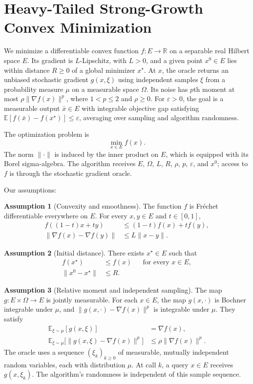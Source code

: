 \documentclass[10pt]{article}
\theoremstyle{definition}
\newtheorem{assumption}{Assumption}
\begin{document}
\section*{Heavy-Tailed Strong-Growth Convex Minimization}
We minimize a differentiable convex function $f:E\to\mathbb{R}$ on a separable real Hilbert space $E$. Its gradient is $L$-Lipschitz, with $L>0$, and a given point $x^0\in E$ lies within distance $R\geq0$ of a global minimizer $x^\star$. At $x$, the oracle returns an unbiased stochastic gradient $g(x,\xi)$ using independent samples $\xi$ from a probability measure $\mu$ on a measurable space $\Omega$. Its noise has $p$th moment at most $\rho\|\nabla f(x)\|^p$, where $1<p\leq2$ and $\rho\geq0$. For $\varepsilon>0$, the goal is a measurable output $\bar{x}\in E$ with integrable objective gap satisfying $\mathbb{E}[f(\bar{x})-f(x^\star)]\leq\varepsilon$, averaging over sampling and algorithm randomness.

The optimization problem is
\[
\min_{x\in E} f(x).
\]
The norm $\|\cdot\|$ is induced by the inner product on $E$, which is equipped with its Borel sigma-algebra. The algorithm receives $E$, $\Omega$, $L$, $R$, $\rho$, $p$, $\varepsilon$, and $x^0$; access to $f$ is through the stochastic gradient oracle.

Our assumptions:
\begin{assumption}[Convexity and smoothness]
The function $f$ is Fr\'echet differentiable everywhere on $E$. For every $x,y\in E$ and $t\in[0,1]$,
\[
\begin{aligned}
f((1-t)x+ty)&\leq(1-t)f(x)+t f(y),\\
\|\nabla f(x)-\nabla f(y)\|&\leq L\|x-y\|.
\end{aligned}
\]
\end{assumption}

\begin{assumption}[Initial distance]
There exists $x^\star\in E$ such that
\[
\begin{aligned}
f(x^\star)&\leq f(x) &&\text{for every }x\in E,\\
\|x^0-x^\star\|&\leq R.
\end{aligned}
\]
\end{assumption}

\begin{assumption}[Relative moment and independent sampling]
The map $g:E\times\Omega\to E$ is jointly measurable. For each $x\in E$, the map $g(x,\cdot)$ is Bochner integrable under $\mu$, and $\|g(x,\cdot)-\nabla f(x)\|^p$ is integrable under $\mu$. They satisfy
\[
\begin{aligned}
\mathbb{E}_{\xi\sim\mu}[g(x,\xi)]&=\nabla f(x),\\
\mathbb{E}_{\xi\sim\mu}\bigl[\|g(x,\xi)-\nabla f(x)\|^p\bigr]
&\leq\rho\|\nabla f(x)\|^p.
\end{aligned}
\]
The oracle uses a sequence $(\xi_k)_{k\geq0}$ of measurable, mutually independent random variables, each with distribution $\mu$. At call $k$, a query $x\in E$ receives $g(x,\xi_k)$. The algorithm's randomness is independent of this sample sequence.
\end{assumption}
\end{document}
